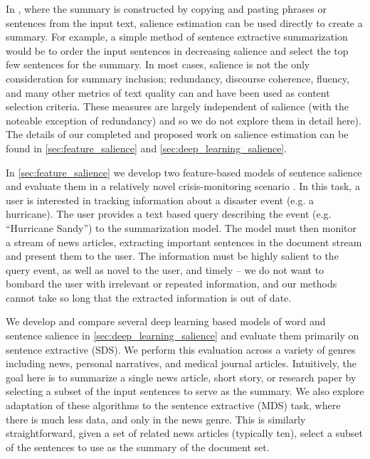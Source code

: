 In , 
where the summary is constructed by copying and pasting phrases or sentences 
from the input text, salience estimation can be used directly to create
a summary. For example, a simple method of sentence extractive summarization
would be to order the input sentences in decreasing salience and select the
top few sentences for the summary. In most cases, salience is not the only
consideration for summary inclusion; redundancy, discourse coherence, fluency,
and many other metrics of text quality can and have been used as content
selection criteria. These measures are largely independent of salience 
(with the noteable exception of redundancy) and so we do not explore them in 
detail here). The details of our completed and proposed work on 
salience estimation can be found
in \autoref{sec:feature_salience} and \autoref{sec:deep_learning_salience}.

In \autoref{sec:feature_salience} we develop two feature-based models of 
sentence
salience and evaluate them in a relatively novel  crisis-monitoring scenario
\citep{starbird2013working,aslam2015trec,aslam2016trec}. In this task, a user is interested
in tracking information about a disaster event (e.g. a hurricane). The
user provides a text based query describing the event 
(e.g. ``Hurricane Sandy'') to the summarization model. 
The model must then 
monitor a stream of news articles, extracting important sentences in the 
document stream and present them to the user. The information must be 
highly salient to the query event, as well as novel to the user, and timely
-- we do not want to bombard the user with irrelevant or repeated information,
and our methods cannot take so long  that the extracted
information is out of date.
  
We develop and compare several deep learning based models of word and 
sentence salience in \autoref{sec:deep_learning_salience} and evaluate them 
primarily on
sentence extractive  (SDS). 
We perform this evaluation across
a variety of genres including news, personal narratives, and medical journal
articles. Intuitively, the goal here is to summarize a single news article, 
short story, or research paper by selecting a subset of the input sentences
to serve as the summary. We also explore adaptation of these algorithms to 
the sentence extractive  (MDS) task, 
where there is much less data, and only in the news genre.
This is similarly straightforward, given a set of related news articles 
(typically ten), select a subset of the sentences to use as the summary of
the document set.


